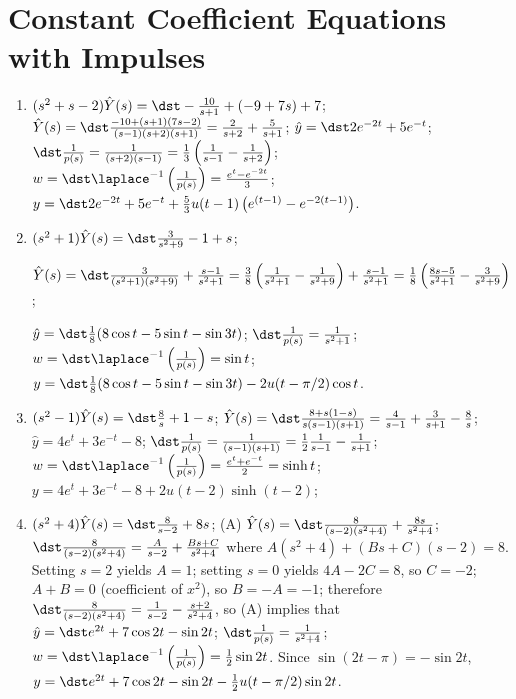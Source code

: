 \documentclass[openany]{book}
\newenvironment{sectionSolutions}{
 \begin{enumerate}[item-label={\thesection.\arabic{enumi}.}]
}{
 \end{enumerate}
}
\begin{document}
\section{Constant Coefficient Equations with Impulses}

\begin{sectionSolutions}
\item
 $(s^2+s-2)\hat Y(s)=\dst-\frac{10}{ s+1}+(-9+7s)+7$;
$\hat Y(s)=\dst\frac{-10+(s+1)(7s-2)}{(s-1)(s+2)(s+1)}=\frac{2}{
s+2}+\frac{5}{ s+1}$;
$\hat y=\dst2e^{-2t}+5e^{-t}$;
$\dst\frac{1}{ p(s)}=\frac{1}{(s+2)(s-1)}=\frac{1}{3}\left(\frac{1}{
s-1}-\frac{1}{ s+2}\right)$;
$w=\dst\laplace ^{-1}\left(\frac{1}{ p(s)}\right)=\frac{e^t-e^{-2t}}{3}$;
$y=\dst2e^{-2t}+5e^{-t}+\frac{5}{3}u(t-1)\left(e^{(t-1)}-e^{-2(t-1)}\right)$.


\item
 $(s^2+1)\hat Y(s)=\dst\frac{3}{ s^2+9}-1+s$;

$\hat Y(s)=\dst\frac{3}{(s^2+1)(s^2+9)}+\frac{s-1}{ s^2+1}=
\frac{3}{8}\left(\frac{1}{ s^2+1}-\frac{1}{ s^2+9}\right)+\frac{s-1}{ s^2+1}
=\frac{1}{8}\left(\frac{8s-5}{ s^2+1}-\frac{3}{ s^2+9}\right)$;


$\hat y=\dst\frac{1}{8}(8\cos t-5\sin t-\sin3t)$;
$\dst\frac{1}{ p(s)}=\frac{1}{ s^2+1}$;
$w=\dst\laplace ^{-1}\left(\frac{1}{ p(s)}\right)=\sin t$;
$y=\dst\frac{1}{8}(8\cos t-5\sin t-\sin3t)-2u(t-\pi/2)\cos t$.


\item
 $(s^2-1)\hat Y(s)=\dst\frac{8}{ s}+1-s$;
$\hat Y(s)=\dst\frac{8+s(1-s)}{ s(s-1)(s+1)}=
\frac{4}{ s-1}+\frac{3}{ s+1}-\frac{8}{ s}$;
$\hat y=4e^t+3e^{-t}-8$;
$\dst\frac{1}{ p(s)}=\frac{1}{(s-1)(s+1)}=\frac{1}{2}\frac{1}{ s-1}
-\frac{1}{ s+1}$;
$w=\dst\laplace ^{-1}\left(\frac{1}{ p(s)}\right)=\frac{e^t+e^{-t}}{2}=
\sinh t$;
$y=4e^t+3e^{-t}-8+2u(t-2)\sinh(t-2)$;


\item
 $(s^2+4)\hat Y(s)=\dst\frac{8}{ s-2}+8s$;
(A) $\hat Y(s)=\dst\frac{8}{(s-2)(s^2+4)}+\frac{8s}{ s^2+4}$;
$\dst\frac{8}{(s-2)(s^2+4)}=\frac{A}{ s-2}+\frac{Bs+C}{ s^2+4}$
where $A(s^2+4)+(Bs+C)(s-2)=8$. Setting $s=2$ yields $A=1$;
setting $s=0$ yields $4A-2C=8$, so $C=-2$; $A+B=0$
(coefficient of $x^2$), so $B=-A=-1$; therefore
$\dst\frac{8}{(s-2)(s^2+4)}=\frac{1}{ s-2}-\frac{s+2}{ s^2+4}$, so
(A) implies that
$\hat y=\dst e^{2t}+7\cos2t-\sin2t$;
$\dst\frac{1}{ p(s)}=\frac{1}{ s^2+4}$;
$w=\dst\laplace ^{-1}\left(\frac{1}{ p(s)}\right)=\frac{1}{2}\sin2t$.
Since $\sin(2t-\pi)=-\sin2t$,
$y=\dst e^{2t}+7\cos2t-\sin2t-\frac{1}{2}u(t-\pi/2)\sin2t$.



\end{sectionSolutions}
\end{document}
